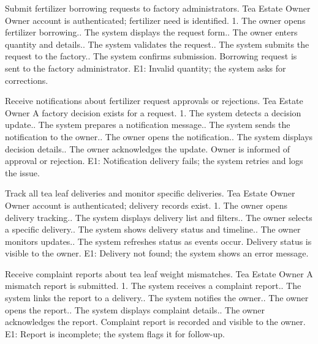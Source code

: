 {Submit fertilizer borrowing requests to factory administrators.}
{Tea Estate Owner}
{Owner account is authenticated; fertilizer need is identified.}
{1. The owner opens fertilizer borrowing.. The system displays the request form.. The owner enters quantity and details.. The system validates the request.. The system submits the request to the factory.. The system confirms submission.}
{Borrowing request is sent to the factory administrator.}
{E1: Invalid quantity; the system asks for corrections.}

{Receive notifications about fertilizer request approvals or rejections.}
{Tea Estate Owner}
{A factory decision exists for a request.}
{1. The system detects a decision update.. The system prepares a notification message.. The system sends the notification to the owner.. The owner opens the notification.. The system displays decision details.. The owner acknowledges the update.}
{Owner is informed of approval or rejection.}
{E1: Notification delivery fails; the system retries and logs the issue.}

{Track all tea leaf deliveries and monitor specific deliveries.}
{Tea Estate Owner}
{Owner account is authenticated; delivery records exist.}
{1. The owner opens delivery tracking.. The system displays delivery list and filters.. The owner selects a specific delivery.. The system shows delivery status and timeline.. The owner monitors updates.. The system refreshes status as events occur.}
{Delivery status is visible to the owner.}
{E1: Delivery not found; the system shows an error message.}

{Receive complaint reports about tea leaf weight mismatches.}
{Tea Estate Owner}
{A mismatch report is submitted.}
{1. The system receives a complaint report.. The system links the report to a delivery.. The system notifies the owner.. The owner opens the report.. The system displays complaint details.. The owner acknowledges the report.}
{Complaint report is recorded and visible to the owner.}
{E1: Report is incomplete; the system flags it for follow-up.}

